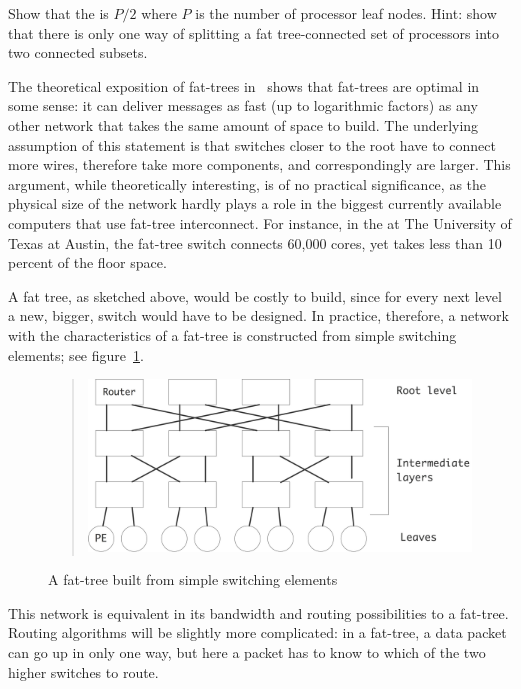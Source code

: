 \begin{exercise}
Show that the  is $P/2$
where $P$ is the number of processor leaf nodes. Hint: show that there
is only one way of splitting a fat tree-connected set of processors
into two connected subsets.
\end{exercise}

The theoretical exposition of fat-trees in~\cite{Leiserson:fattree}
shows that fat-trees are optimal in some sense: it can deliver
messages as fast (up to logarithmic factors) as any other network that
takes the same amount of space to build. The underlying assumption of
this statement is that switches closer to the root have to connect
more wires, therefore take more components, and correspondingly are
larger. 
%
This argument, while theoretically interesting, is of no practical
significance, as the physical size of the network hardly plays a role
in the biggest currently available computers that use fat-tree
interconnect. For instance, in the
 at The
University of Texas at Austin, the fat-tree switch connects 60,000
cores, yet takes less than 10 percent of the floor space.

A fat tree, as sketched above, would be costly to build, since for
every next level a new, bigger, switch would have to be designed. In
practice, therefore, a network with the characteristics of a fat-tree
is constructed from simple switching elements; see
figure~\ref{fig:fattreeclos}.
\begin{figure}[ht]
  \begin{quote}
    \includegraphics[scale=.11]{graphics/fattree-clos}
  \end{quote}
  \caption{A fat-tree built from simple switching elements}
  \label{fig:fattreeclos}
\end{figure}
This network is equivalent in its bandwidth and routing possibilities
to a fat-tree. Routing algorithms will be slightly more complicated:
in a fat-tree, a data packet can go up in only one way, but here a
packet has to know to which of the two higher switches to route.

